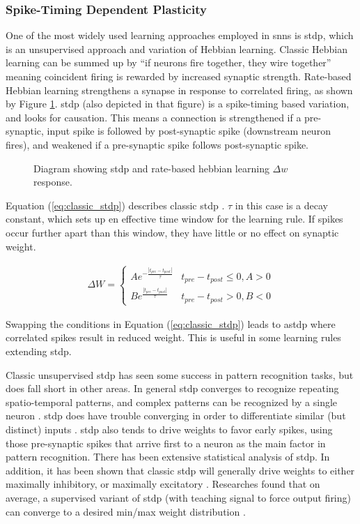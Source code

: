 \documentclass[conference]{IEEEtran}
\newcommand{\asvgf}[4]{
	\begin{figure}[!htbp]
    	\centering
		\adjustbox{max width=#4\linewidth}{}
        \caption{#2.}
        \label{#3}
	\end{figure}
}
\newcommand{\eq}[1]{Equation (\ref{#1})}
\begin{document}
\subsubsection{Spike-Timing Dependent Plasticity}
One of the most widely used learning approaches employed in \glspl{snn} is
\gls{stdp}, which is an unsupervised approach and variation of Hebbian
learning. Classic Hebbian learning can be summed up by ``if neurons fire
together, they wire together'' meaning coincident firing is rewarded by
increased synaptic strength. Rate-based Hebbian learning strengthens a
synapse in response to correlated firing, as shown by Figure
\ref{fig:heb_rate_stdp}. \Gls{stdp} (also depicted in that figure) is a
spike-timing based variation, and looks for causation. This means a
connection is strengthened if a pre-synaptic, input spike is followed by
post-synaptic spike (downstream neuron fires), and weakened if a
pre-synaptic spike follows post-synaptic spike.

\asvgf{figures/heb_diagrams.svg}{Diagram showing \gls{stdp} and rate-based
  hebbian learning $\Delta w$ response}{fig:heb_rate_stdp}{0.7}

\eq{eq:classic_stdp} describes classic \gls{stdp}
\parencite{tavanaei_2019}. $\tau$ in this case is a decay constant, which
sets up en effective time window for the learning rule. If spikes occur
further apart than this window, they have little or no effect on synaptic
weight.

\begin{align}
  \Delta W =
  \begin{cases}
    Ae^{-\frac{|t_{pre}-t_{post}|}{\tau}} & t_{pre} - t_{post} \leq 0, A > 0
    \\ Be^{\frac{|t_{pre}-t_{post}|}{\tau}} & t_{pre} - t_{post} > 0, B < 0
  \end{cases} \label{eq:classic_stdp}
\end{align}

Swapping the conditions in \eq{eq:classic_stdp} leads to
\gls{astdp} where correlated spikes result in reduced weight. This
is useful in some learning rules extending \gls{stdp}.

Classic unsupervised \gls{stdp} has seen some success in pattern recognition
tasks, but does fall short in other areas. In general \gls{stdp} converges to
recognize repeating spatio-temporal patterns, and complex patterns can be
recognized by a single neuron \parencite{tavanaei_2019}. \Gls{stdp} does have
trouble converging in order to differentiate similar (but distinct) inputs
\parencite{vigneron_2020}. \Gls{stdp} also tends to drive weights to favor early
spikes, using those pre-synaptic spikes that arrive first to a neuron as the
main factor in pattern recognition. There has been extensive statistical
analysis of \gls{stdp}. In addition, it has been shown that classic \gls{stdp}
will generally drive weights to either maximally inhibitory, or maximally
excitatory \parencite{legenstein_2005}. Researches found that on average, a
supervised variant of \gls{stdp} (with teaching signal to force output firing)
can converge to a desired min/max weight distribution
\parencite{legenstein_2005}.
\end{document}
